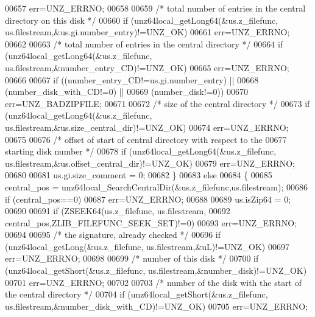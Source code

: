 \begin{DoxyCode}
00657             err=UNZ\_ERRNO;
00658 
00659         \textcolor{comment}{/* total number of entries in the central directory on this disk */}
00660         \textcolor{keywordflow}{if} (unz64local\_getLong64(&us.z\_filefunc, us.filestream,&us.gi.number\_entry)!=UNZ\_OK)
00661             err=UNZ\_ERRNO;
00662 
00663         \textcolor{comment}{/* total number of entries in the central directory */}
00664         \textcolor{keywordflow}{if} (unz64local\_getLong64(&us.z\_filefunc, us.filestream,&number\_entry\_CD)!=UNZ\_OK)
00665             err=UNZ\_ERRNO;
00666 
00667         \textcolor{keywordflow}{if} ((number\_entry\_CD!=us.gi.number\_entry) ||
00668             (number\_disk\_with\_CD!=0) ||
00669             (number\_disk!=0))
00670             err=UNZ\_BADZIPFILE;
00671 
00672         \textcolor{comment}{/* size of the central directory */}
00673         \textcolor{keywordflow}{if} (unz64local\_getLong64(&us.z\_filefunc, us.filestream,&us.size\_central\_dir)!=UNZ\_OK)
00674             err=UNZ\_ERRNO;
00675 
00676         \textcolor{comment}{/* offset of start of central directory with respect to the}
00677 \textcolor{comment}{          starting disk number */}
00678         \textcolor{keywordflow}{if} (unz64local\_getLong64(&us.z\_filefunc, us.filestream,&us.offset\_central\_dir)!=UNZ\_OK)
00679             err=UNZ\_ERRNO;
00680 
00681         us.gi.size\_comment = 0;
00682     \}
00683     \textcolor{keywordflow}{else}
00684     \{
00685         central\_pos = unz64local\_SearchCentralDir(&us.z\_filefunc,us.filestream);
00686         \textcolor{keywordflow}{if} (central\_pos==0)
00687             err=UNZ\_ERRNO;
00688 
00689         us.isZip64 = 0;
00690 
00691         \textcolor{keywordflow}{if} (ZSEEK64(us.z\_filefunc, us.filestream,
00692                                         central\_pos,ZLIB\_FILEFUNC\_SEEK\_SET)!=0)
00693             err=UNZ\_ERRNO;
00694 
00695         \textcolor{comment}{/* the signature, already checked */}
00696         \textcolor{keywordflow}{if} (unz64local\_getLong(&us.z\_filefunc, us.filestream,&uL)!=UNZ\_OK)
00697             err=UNZ\_ERRNO;
00698 
00699         \textcolor{comment}{/* number of this disk */}
00700         \textcolor{keywordflow}{if} (unz64local\_getShort(&us.z\_filefunc, us.filestream,&number\_disk)!=UNZ\_OK)
00701             err=UNZ\_ERRNO;
00702 
00703         \textcolor{comment}{/* number of the disk with the start of the central directory */}
00704         \textcolor{keywordflow}{if} (unz64local\_getShort(&us.z\_filefunc, us.filestream,&number\_disk\_with\_CD)!=UNZ\_OK)
00705             err=UNZ\_ERRNO;

\end{DoxyCode}
